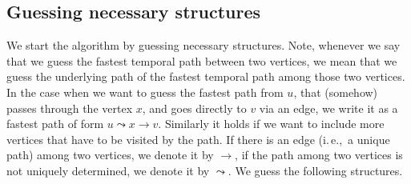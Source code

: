 \documentclass[11pt,a4paper]{article}
\theoremstyle{remark}
\theoremstyle{definition}
\newcommand{\ie}{i.\,e.,\ }
\begin{document}
\subsection{Guessing necessary structures}
We start the algorithm by guessing necessary structures.
Note, whenever we say that we guess the fastest temporal path between two vertices, we mean that we guess the underlying path of the fastest temporal path among those two vertices.
In the case when we want to guess the fastest path from $u$, that (somehow) passes through the vertex $x$, and goes directly to $v$ via an edge, we write it as a fastest path of form $u \leadsto x \rightarrow v$.
Similarly it holds if we want to include more vertices that have to be visited by the path. If there is an edge (\ie a unique path) among two vertices, we denote it by $\rightarrow$,
if the path among two vertices is not uniquely determined, we denote it by $\leadsto$.
We guess the following structures.
\end{document}
